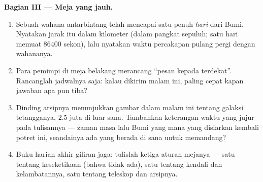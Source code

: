 \begin{problem}
\medskip\noindent\textbf{Bagian III --- Meja yang jauh.}
\begin{enumerate}[resume]
  \item Sebuah wahana antarbintang telah mencapai satu penuh
        \emph{hari}  dari Bumi. Nyatakan jarak itu dalam
        kilometer (dalam pangkat sepuluh; satu hari memuat $86400$
        sekon), lalu nyatakan waktu percakapan pulang pergi dengan
        wahananya.
  \item Para pemimpi di meja belakang merancang ``pesan kepada
         terdekat''. Rancanglah jadwalnya saja: kalau dikirim
        malam ini, paling cepat kapan jawaban apa pun tiba?
  \item Dinding arsipnya menunjukkan gambar dalam malam ini tentang
        galaksi tetangganya, $2.5$ juta  di luar sana.
        Tambahkan keterangan waktu yang jujur pada tulisannya --- zaman
        masa lalu Bumi yang mana yang disiarkan kembali potret ini,
        seandainya ada yang berada di sana untuk memandang?
  \item Buku harian akhir giliran jaga: tulislah ketiga aturan
        mejanya --- satu tentang keseketikaan (bahwa tidak ada), satu
        tentang  kendali dan kelambatannya, satu tentang teleskop
        dan arsipnya.
\end{enumerate}
\end{problem}
